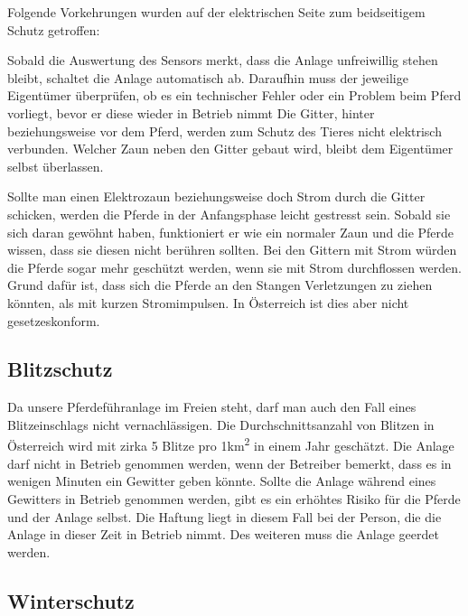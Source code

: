 Folgende Vorkehrungen wurden auf der elektrischen Seite zum beidseitigem Schutz getroffen:

Sobald die Auswertung des Sensors merkt, dass die Anlage unfreiwillig stehen bleibt, schaltet die Anlage automatisch ab. Daraufhin muss der jeweilige Eigentümer überprüfen, ob es ein technischer Fehler oder ein Problem beim Pferd vorliegt, bevor er diese wieder in Betrieb nimmt
Die Gitter, hinter beziehungsweise vor dem Pferd, werden zum Schutz des Tieres nicht elektrisch verbunden.
Welcher Zaun neben den Gitter gebaut wird, bleibt dem Eigentümer selbst überlassen.

Sollte man einen Elektrozaun beziehungsweise doch Strom durch die Gitter schicken, werden die Pferde in der Anfangsphase leicht gestresst sein. Sobald sie sich daran gewöhnt haben, funktioniert er wie ein normaler Zaun und die Pferde wissen, dass sie diesen nicht berühren sollten.
Bei den Gittern mit Strom würden die Pferde sogar mehr geschützt werden, wenn sie mit Strom durchflossen werden. Grund dafür ist, dass sich die Pferde an den Stangen Verletzungen zu ziehen könnten, als mit kurzen Stromimpulsen. In Österreich ist dies aber nicht gesetzeskonform.

\subsection{Blitzschutz}
\label{sec:blitzschutz}

Da unsere Pferdeführanlage im Freien steht, darf man auch den Fall eines Blitzeinschlags nicht vernachlässigen. 
Die Durchschnittsanzahl von Blitzen in Österreich wird mit zirka 5 Blitze pro 1km\textsuperscript{2} in einem Jahr geschätzt. 
Die Anlage darf nicht in Betrieb genommen werden, wenn der Betreiber bemerkt, 
dass es in wenigen Minuten ein Gewitter geben könnte.
Sollte die Anlage während eines Gewitters in Betrieb genommen werden, 
gibt es ein erhöhtes Risiko für die Pferde und der Anlage selbst.
Die Haftung liegt in diesem Fall bei der Person, die die Anlage in dieser Zeit in Betrieb nimmt.
Des weiteren muss die Anlage geerdet werden. 


\subsection{Winterschutz}
\label{sec:winterschutz}

